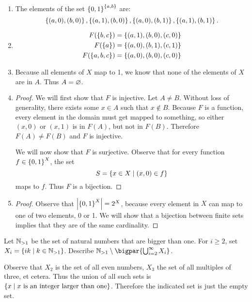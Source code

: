 \documentclass[class=article, crop=false]{standalone}
\begin{document}
  \begin{enumerate}[label=(\alph*)]
    \item The elements of the set $\left\{0, 1\right\}^{\left\{a, b\right\}}$ are:
    \[
      \left\{(a,0),(b,0)\right\}, \left\{(a,1),(b,0)\right\}, \left\{(a,0),(b,1)\right\}, \left\{(a,1),(b,1)\right\}.
    \]
    \item
    \begin{align*}
      F(\left\{b, c\right\}) &= \left\{(a, 1), (b, 0), (c, 0)\right\} \\
      F(\left\{a\right\}) &= \left\{(a, 0), (b, 1), (c, 1)\right\} \\
      F(\left\{a, b, c\right\}) &= \left\{(a, 0), (b, 0), (c, 0)\right\}
    \end{align*}
    \item Because all elements of $X$ map to 1, we know that none of the elements of $X$ are in $A$. Thus $A = \varnothing$.
    \item
    \begin{proof}
      We will first show that $F$ is injective. Let $A \neq B$. Without loss of generality, there exists some $x\in A$ such that $x \notin B$. Because $F$ is a function, every element in the domain must get mapped to something, so either $(x, 0)$ or $(x, 1)$ is in $F(A)$, but not in $F(B)$. Therefore $F(A) \neq F(B)$ and $F$ is injective. \par
      We will now show that $F$ is surjective. Observe that for every function $f\in \left\{0, 1\right\}^{X}$, the set
      \[
        S = \left\{x\in X\mid (x, 0)\in f\right\}
      \]
      maps to $f$. Thus $F$ is a bijection.
    \end{proof}
    \item
    \begin{proof}
      Observe that $\left\lvert \left\{0, 1\right\}^X \right\rvert = 2^X$, because every element in $X$ can map to one of two elements, 0 or 1. We will show that a bijection between finite sets implies that they are of the same cardinality.
    \end{proof}
  \end{enumerate}
  \newpage
  \begin{problem}{2}
    Let $\mathbb{N}_{>1}$ be the set of natural numbers that are bigger than one. For $i \geq 2$, set $X_i = \left\{ik\mid k \in \mathbb{N}_{>1}\right\}$. Describe $\N_{>1} \sm \bigpar{\bigcup_{i=2}^\infty X_i}$.
  \end{problem}
  Observe that $X_2$ is the set of all even numbers, $X_3$ the set of all multiples of three, et cetera. Thus the union of all such sets is $\left\{x\mid x \text{ is an integer larger than one}\right\}$. Therefore the indicated set is just the empty set.
\end{document}
